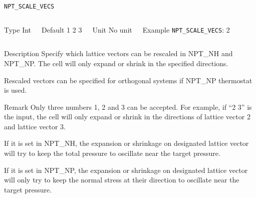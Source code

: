 \begin{frame}[allowframebreaks]{\texttt{NPT\_SCALE\_VECS}} \label{NPT_SCALE_VECS}
\vspace*{-12pt}
\begin{columns}
\begin{block}{Type}
Int
\end{block}

\begin{block}{Default}
1 2 3
\end{block}

\begin{block}{Unit}
No unit
\end{block}

\begin{block}{Example}
\texttt{NPT\_SCALE\_VECS}: 2
\end{block}
\end{columns}

\begin{block}{Description}
Specify which lattice vectors can be rescaled in NPT\_NH and NPT\_NP. The cell will only expand or shrink in the specified directions.

Rescaled vectors can be specified for orthogonal systems if NPT\_NP thermostat is used.
\end{block}

\begin{block}{Remark}
Only three numbers 1, 2 and 3 can be accepted. For example, if ``2 3'' is the input, the cell will only expand or shrink in the directions of lattice vector 2 and lattice vector 3.

If it is set in NPT\_NH, the expansion or shrinkage on designated lattice vector will try to keep the total pressure to oscillate near the target pressure.

If it is set in NPT\_NP, the expansion or shrinkage on designated lattice vector will only try to keep the normal stress at their direction to oscillate near the target pressure.
\end{block}

\end{frame}




